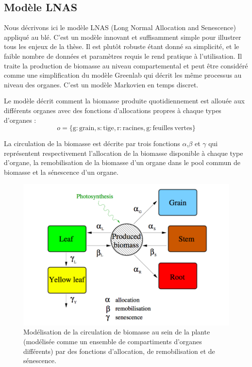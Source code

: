 \subsection{Modèle LNAS}
Nous décrivons ici le modèle LNAS (Long Normal Allocation and Senescence) appliqué au blé. C’est un modèle innovant et suffisamment simple pour illustrer tous les enjeux de la thèse. Il est plutôt robuste étant donné sa simplicité, et le faible nombre de données et paramètres requis le rend pratique à l’utilisation. Il traite la production de biomasse au niveau compartemental et peut être considéré comme une simplification du modèle Greenlab qui décrit les même processus au niveau des organes.
C’est un modèle Markovien en temps discret.

Le modèle décrit comment la biomasse produite quotidiennement est allouée aux différents organes avec des fonctions d'allocations propres à chaque types d'organes :
\[ o = \{\mathrm{g:grain, s:tige, r:racines, g : feuilles~vertes}\} \]

La circulation de la biomasse est décrite par trois fonctions $\alpha$,$\beta$ et $\gamma$ qui représentent respectivement l'allocation de la biomasse disponible à chaque type d'organe, la remobilisation de la biomasse d'un organe dans le pool commun de biomasse et la sénescence d'un organe.

\begin{figure}[h]
\centering
  \includegraphics[scale=0.37]{./img/schema-lnas.png}
  \caption{Modélisation de la circulation de biomasse au sein de la plante (modélisée comme un ensemble de compartiments d'organes différents) par des fonctions d'allocation, de remobilisation et de sénescence.}
  \label{fig:circulation_biomasse}
\end{figure}




